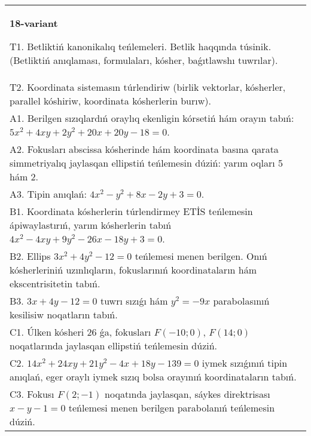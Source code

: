 \documentclass{article}
\begin{document}
\begin{tabular}{m{17cm}}
\textbf{18-variant}
\newline

T1. Betliktiń kanonikalıq teńlemeleri. Betlik haqqında túsinik. (Betliktiń anıqlaması, formulaları, kósher, baǵıtlawshı tuwrılar).\\

T2. Koordinata sistemasın túrlendiriw (birlik vektorlar, kósherler, parallel kóshiriw, koordinata kósherlerin burıw).\\

A1. Berilgen sızıqlardıń oraylıq ekenligin kórsetiń hám orayın tabıń: $5 x^{2}+4 xy+2 y^{2}+20 x+20 y-18=0$.\\

A2. Fokusları abscissa kósherinde hám koordinata basına qarata simmetriyalıq jaylasqan ellipstiń teńlemesin dúziń: yarım oqları 5 hám 2.\\

A3. Tipin anıqlań: $4 x^{2}-y^{2}+8 x-2 y+3=0$.\\

B1. Koordinata kósherlerin túrlendirmey ETİS teńlemesin ápiwaylastırıń, yarım kósherlerin tabıń $4x^{2} - 4xy + 9y^{2} - 26x - 18y + 3 = 0$.\\

B2. Ellips $3x^{2} + 4y^{2} - 12 = 0$ teńlemesi menen berilgen. Onıń kósherleriniń uzınlıqların, fokuslarınıń koordinataların hám ekscentrisitetin tabıń.  \\

B3. $3x + 4y - 12 = 0$ tuwrı sızıǵı hám $y^{2} = - 9x$ parabolasınıń kesilisiw noqatların tabıń.  \\

C1. Úlken kósheri 26 ǵa, fokusları $F( - 10;0)$, $F(14;0)$ noqatlarında jaylasqan ellipstiń teńlemesin dúziń.  \\

C2. $14x^{2} + 24xy + 21y^{2} - 4x + 18y - 139 = 0$ iymek sızıǵınıń tipin anıqlań, eger oraylı iymek sızıq bolsa orayınıń koordinataların tabıń.  \\

C3. Fokusı $F(2; - 1)$ noqatında jaylasqan, sáykes direktrisası $x - y - 1 = 0$ teńlemesi menen berilgen parabolanıń teńlemesin dúziń.  \\

\end{tabular}
\vspace{1cm}
\end{document}
